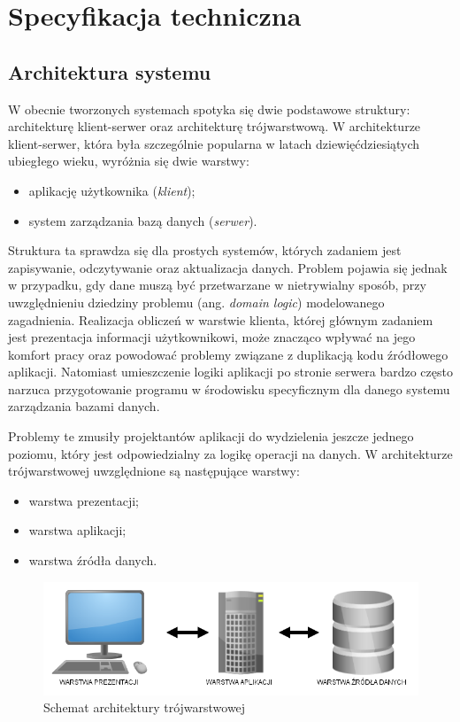\section{Specyfikacja techniczna}

\subsection{Architektura systemu}

W obecnie tworzonych systemach spotyka się dwie podstawowe struktury:
architekturę klient-serwer oraz architekturę trójwarstwową.  W
architekturze klient-serwer, która była szczególnie popularna w latach
dziewięćdziesiątych ubiegłego wieku, wyróżnia się dwie warstwy:
\begin{itemize}
\item aplikację użytkownika (\emph{klient});
\item system zarządzania bazą danych (\emph{serwer}).
\end{itemize}

Struktura ta sprawdza się dla prostych systemów, których zadaniem jest
zapisywanie, odczytywanie oraz aktualizacja danych. Problem pojawia
się jednak w przypadku, gdy dane muszą być przetwarzane w nietrywialny
sposób, przy uwzględnieniu dziedziny problemu (ang. \emph{domain
  logic}) modelowanego zagadnienia. Realizacja obliczeń w warstwie
klienta, której głównym zadaniem jest prezentacja informacji
użytkownikowi, może znacząco wpływać na jego komfort pracy oraz
powodować problemy związane z duplikacją kodu źródłowego aplikacji.
Natomiast umieszczenie logiki aplikacji po stronie serwera bardzo
często narzuca przygotowanie programu w środowisku specyficznym dla
danego systemu zarządzania bazami danych.

Problemy te zmusiły projektantów aplikacji do wydzielenia jeszcze
jednego poziomu, który jest odpowiedzialny za logikę operacji na
danych. W architekturze trójwarstwowej uwzględnione są następujące
warstwy:
\begin{itemize}
\item warstwa prezentacji;
\item warstwa aplikacji;
\item warstwa źródła danych.
\end{itemize}

\begin{figure}[h]
  \begin{center}
    \includegraphics[scale=0.5]{../img/arch-3warstw.png}
  \end{center}
  \label{fig:arch3warstw}
  \caption{Schemat architektury trójwarstwowej}
\end{figure}
\FloatBarrier


